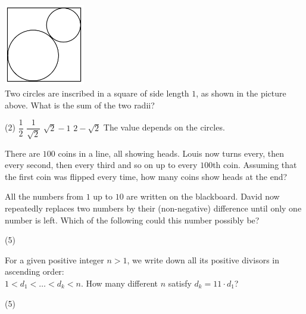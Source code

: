 \documentclass{article}
\begin{document}
\begin{problem}
\includegraphics[width=100pt]{img3} \\
Two circles are inscribed in a square of side length $1$, as shown in the picture above. What is the sum of the two radii?
\end{problem}
\begin{tasks}(2)
\task $\dfrac{1}{2}$
\task $\dfrac{1}{\sqrt{2}}$
\task $\sqrt{2} - 1$
\task $2 - \sqrt{2}$
\task The value depends on the circles.
\end{tasks}

\begin{problem}
There are $100$ coins in a line, all showing heads. Louis now turns every, then every second, then every third and so on up to every $100$th coin. Assuming that the first coin was flipped every time, how many coins show heads at the end?
\end{problem}
\begin{tasks}
\end{tasks}

\begin{problem}
All the numbers from $1$ up to $10$ are written on the blackboard. David now repeatedly replaces two numbers by their (non-negative) difference until only one number is left. Which of the following could this number possibly be?
\begin{tasks}(5)
\end{tasks}
\end{problem}

\begin{problem}
For a given positive integer $n > 1$, we write down all its positive divisors in ascending order: \\
$1 < d_1 < \ldots < d_k < n$. How many different $n$ satisfy $d_k = 11\cdot d_1$?
\end{problem}
\begin{tasks}(5)
\end{tasks}
\end{document}
